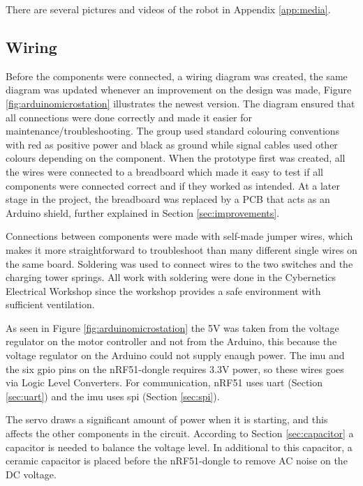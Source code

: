 There are several pictures and videos of the robot in Appendix \ref{app:media}.

\subsection{Wiring}
Before the components were connected, a wiring diagram was created, the same diagram was updated whenever an improvement on the design was made, Figure \ref{fig:arduinomicrostation} illustrates the newest version. The diagram ensured that all connections were done correctly and made it easier for maintenance/troubleshooting. The group used standard colouring conventions with red as positive power and black as ground while signal cables used other colours depending on the component. When the prototype first was created, all the wires were connected to a breadboard which made it easy to test if all components were connected correct and if they worked as intended. At a later stage in the project, the breadboard was replaced by a PCB that acts as an Arduino shield, further explained in Section \ref{sec:improvements}.

Connections between components were made with self-made jumper wires, which makes it more straightforward to troubleshoot than many different single wires on the same board. Soldering was used to connect wires to the two switches and the charging tower springs. All work with soldering were done in the Cybernetics Electrical Workshop since the workshop provides a safe environment with sufficient ventilation.

As seen in Figure \ref{fig:arduinomicrostation} the 5V was taken from the voltage regulator on the motor controller and not from the Arduino, this because the voltage regulator on the Arduino could not supply enaugh power. The \acrshort{imu} and the six \acrshort{gpio} pins on the nRF51-dongle requires 3.3V power, so these wires goes via Logic Level Converters. For communication, nRF51 uses \acrshort{uart} (Section \ref{sec:uart}) and the \acrshort{imu} uses \acrshort{spi} (Section \ref{sec:spi}).

The servo draws a significant amount of power when it is starting, and this affects the other components in the circuit. According to Section \ref{sec:capacitor} a capacitor is needed to balance the voltage level. In additional to this capacitor, a ceramic capacitor is placed before the nRF51-dongle to remove AC noise on the DC voltage.